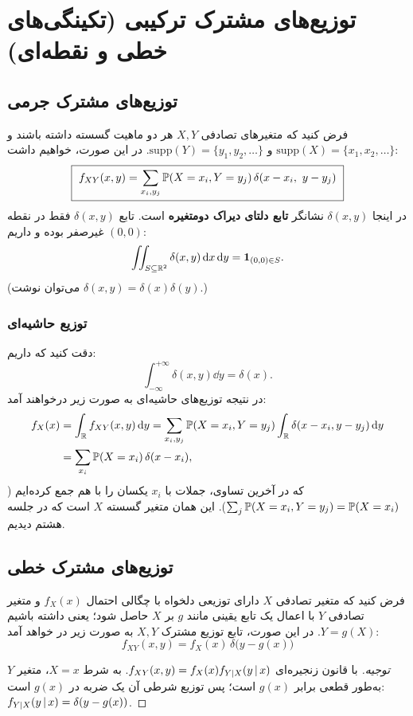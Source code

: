 \section{توزیع‌های مشترک ترکیبی (تکینگی‌های خطی و نقطه‌ای)}

\subsection{توزیع‌های مشترک جرمی}
فرض کنید که متغیرهای تصادفی $X,Y$ هر دو ماهیت گسسته داشته باشند و $\mathrm{supp}(X)=\{x_1,x_2,\ldots\}$ و $\mathrm{supp}(Y)=\{y_1,y_2,\ldots\}$. در این صورت، خواهیم داشت:
\[
\boxed{\ f_{XY}(x,y)=\sum_{x_i,y_j}\Prob(X=x_i,Y=y_j)\,\delta(x-x_i,\ y-y_j)\ }
\]
در اینجا $\delta(x,y)$ نشانگر \textbf{تابع دلتای دیراک دومتغیره} است. تابع $\delta(x,y)$ فقط در نقطه $(0,0)$ غیرصفر بوده و داریم:
\[
\iint_{S\subseteq\mathbb{R}^2}\delta(x,y)\,\mathrm{d} x\,\mathrm{d} y=\mathbf{1}_{(0,0)\in S}.
\]
(می‌توان نوشت $\delta(x,y)=\delta(x)\delta(y)$.)

\subsubsection*{توزیع حاشیه‌ای}
دقت کنید که داریم:
\[
\int_{-\infty}^{+\infty}\delta(x,y)\dd y=\delta(x).
\]
در نتیجه توزیع‌های حاشیه‌ای به صورت زیر درخواهند آمد:
\[
\begin{aligned}
f_X(x)&=\int_{\mathbb{R}} f_{XY}(x,y)\,\mathrm{d} y=\sum_{x_i,y_j}\mathbb{P}(X=x_i,Y=y_j)\int_{\mathbb{R}}\delta(x-x_i,y-y_j)\,\mathrm{d} y\\
&=\sum_{x_i}\mathbb{P}(X=x_i)\,\delta(x-x_i),
\end{aligned}
\]
که در آخرین تساوی، جملات با $x_i$ یکسان را با هم جمع کرده‌ایم ($\sum_j\mathbb{P}(X=x_i,Y=y_j)=\mathbb{P}(X=x_i)$). این همان  متغیر گسسته $X$ است که در جلسه هشتم دیدیم.

\subsection{توزیع‌های مشترک خطی}
\begin{definition}
فرض کنید که متغیر تصادفی $X$ دارای توزیعی دلخواه با چگالی احتمال $f_X(x)$ و متغیر تصادفی $Y$ با اعمال یک تابع یقینی مانند $g$ بر $X$ حاصل شود؛ یعنی داشته باشیم $Y=g(X)$. در این صورت، تابع توزیع مشترک $X,Y$ به صورت زیر در خواهد آمد:
\[
\boxed{\ f_{XY}(x,y)=f_X(x)\,\delta\big(y-g(x)\big)\ }
\]
\end{definition}
\begin{proof}[توجیه]
با قانون زنجیره‌ای $f_{XY}(x,y)=f_X(x)f_{Y|X}(y\,|\, x)$. به شرط $X=x$، متغیر $Y$ به‌طور قطعی برابر $g(x)$ است؛ پس توزیع شرطی آن یک ضربه در $g(x)$ است: $f_{Y|X}(y\,|\, x)=\delta(y-g(x))$.
\end{proof}

